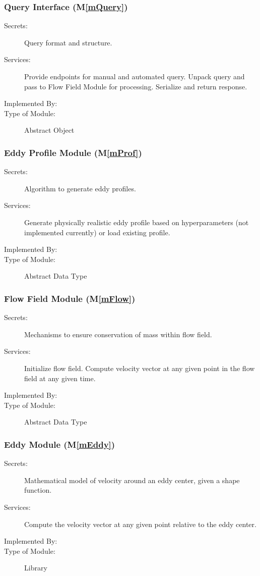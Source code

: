 \documentclass[12pt, titlepage]{article}
\newcommand{\mref}[1]{M\ref{#1}}
\begin{document}
\subsubsection{Query Interface (\mref{mQuery})}
\begin{description}
\item[Secrets:]Query format and structure.
\item[Services:]Provide endpoints for manual and automated query. Unpack query and pass to Flow Field Module for processing. Serialize and return response.
\item[Implemented By:] \progname{}
\item[Type of Module:] Abstract Object
\end{description}

\subsubsection{Eddy Profile Module (\mref{mProf})}
\begin{description}
\item[Secrets:]Algorithm to generate eddy profiles.
\item[Services:]Generate physically realistic eddy profile based on hyperparameters (not implemented currently) or load existing profile.
\item[Implemented By:] \progname{}
\item[Type of Module:] Abstract Data Type
\end{description}

\subsubsection{Flow Field Module (\mref{mFlow})}
\begin{description}
\item[Secrets:]Mechanisms to ensure conservation of mass within flow field.
\item[Services:]Initialize flow field. Compute velocity vector at any given point in the flow field at any given time.
\item[Implemented By:] \progname{}
\item[Type of Module:] Abstract Data Type
\end{description}

\subsubsection{Eddy Module (\mref{mEddy})}
\begin{description}
\item[Secrets:]Mathematical model of velocity around an eddy center, given a shape function.
\item[Services:]Compute the velocity vector at any given point relative to the eddy center.
\item[Implemented By:] \progname{}
\item[Type of Module:] Library
\end{description}
\end{document}
